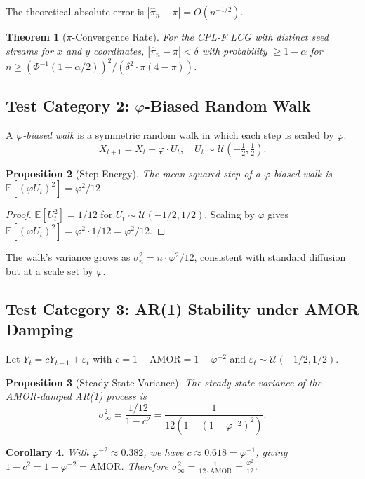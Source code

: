 \documentclass[11pt,a4paper]{article}
\newtheorem{theorem}{Theorem}
\newtheorem{proposition}[theorem]{Proposition}
\newtheorem{corollary}[theorem]{Corollary}
\begin{document}
The theoretical absolute error is $|\hat{\pi}_n - \pi| = O(n^{-1/2})$.

\begin{theorem}[$\pi$-Convergence Rate]
For the CPL-F LCG with distinct seed streams for $x$ and $y$ coordinates,
$|\hat{\pi}_n - \pi| < \delta$ with probability $\ge 1 - \alpha$ for
$n \ge (\Phi^{-1}(1-\alpha/2))^2 / (\delta^2 \cdot \pi(4-\pi))$.
\end{theorem}

\subsection{Test Category 2: $\varphi$-Biased Random Walk}

A \emph{$\varphi$-biased walk} is a symmetric random walk in which each step is scaled
by $\varphi$:
\[
  X_{t+1} = X_t + \varphi \cdot U_t, \quad U_t \sim \mathcal{U}(-\tfrac12, \tfrac12).
\]

\begin{proposition}[Step Energy]
The mean squared step of a $\varphi$-biased walk is
$\mathbb{E}[(\varphi U_t)^2] = \varphi^2 / 12$.
\end{proposition}

\begin{proof}
$\mathbb{E}[U_t^2] = 1/12$ for $U_t \sim \mathcal{U}(-1/2, 1/2)$.  Scaling by $\varphi$
gives $\mathbb{E}[(\varphi U_t)^2] = \varphi^2 \cdot 1/12 = \varphi^2/12$.
\end{proof}

The walk's variance grows as $\sigma^2_n = n \cdot \varphi^2/12$, consistent with
standard diffusion but at a scale set by $\varphi$.

\subsection{Test Category 3: AR(1) Stability under AMOR Damping}

Let $Y_t = c Y_{t-1} + \varepsilon_t$ with $c = 1 - \text{AMOR} = 1 - \varphi^{-2}$
and $\varepsilon_t \sim \mathcal{U}(-1/2, 1/2)$.

\begin{proposition}[Steady-State Variance]
\label{prop:ar1var}
The steady-state variance of the AMOR-damped AR(1) process is
\[
  \sigma^2_\infty = \frac{1/12}{1 - c^2} = \frac{1}{12(1 - (1-\varphi^{-2})^2)}.
\]
\end{proposition}

\begin{corollary}
With $\varphi^{-2} \approx 0.382$, we have $c \approx 0.618 = \varphi^{-1}$, giving
$1 - c^2 = 1 - \varphi^{-2} = \text{AMOR}$.  Therefore
$\sigma^2_\infty = \frac{1}{12 \cdot \text{AMOR}} = \frac{\varphi^2}{12}$.
\end{corollary}
\end{document}
